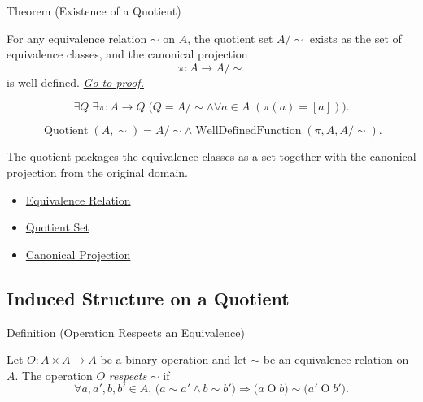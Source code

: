 \begin{theorembox}{Theorem (Existence of a Quotient)}
\begin{theorem}
\label{thm:existence-of-a-quotient}
For any equivalence relation $\sim$ on $A$, the quotient set $A/{\sim}$ exists
as the set of equivalence classes, and the canonical projection
\[
\pi:A\to A/{\sim}
\]
is well-defined.
\hyperref[prf:existence-of-a-quotient]{\textit{Go to proof.}}
\end{theorem}
\end{theorembox}

\begin{remark*}
\[
\exists Q\;\exists \pi:A\to Q\;
\bigl(Q=A/{\sim}\land \forall a\in A\;(\pi(a)=[a])\bigr).
\]
\end{remark*}

\begin{remark*}
\[
\operatorname{Quotient}(A,\sim)=A/{\sim}
\land \operatorname{WellDefinedFunction}(\pi,A,A/{\sim}).
\]
\end{remark*}

\begin{remark*}[Interpretation]
The quotient packages the equivalence classes as a set together with the
canonical projection from the original domain.
\end{remark*}

\begin{dependencies}
\begin{itemize}
  \item \hyperref[def:equivalence-relation]{Equivalence Relation}
  \item \hyperref[def:quotient-set]{Quotient Set}
  \item \hyperref[def:canonical-projection]{Canonical Projection}
\end{itemize}
\end{dependencies}

\subsection*{Induced Structure on a Quotient}

\begin{definitionbox}{Definition (Operation Respects an Equivalence)}
\begin{definition}
\label{def:operation-respects-equivalence}
Let $O:A\times A\to A$ be a binary operation and let $\sim$ be an equivalence
relation on $A$. The operation $O$ \emph{respects} $\sim$ if
\[
\forall a,a',b,b'\in A,\,
\bigl(a\sim a'\land b\sim b'\bigr)
\Longrightarrow
\bigl(a\mathbin{O}b\bigr)\sim\bigl(a'\mathbin{O}b'\bigr).
\]
\end{definition}
\end{definitionbox}

